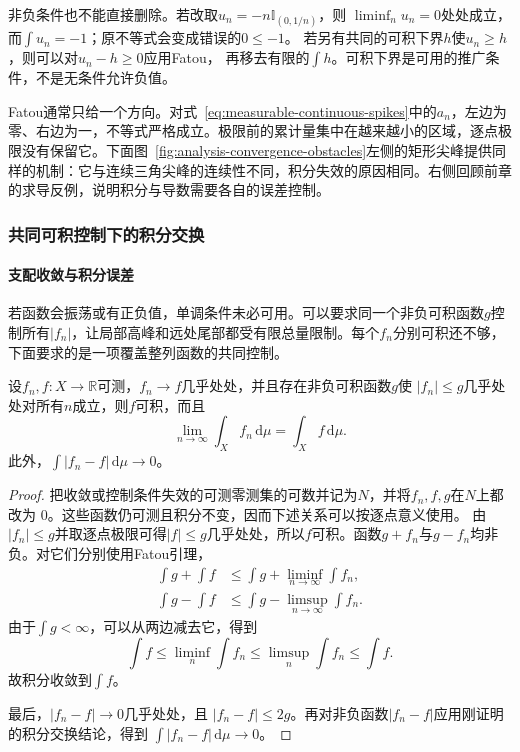 非负条件也不能直接删除。若改取$u_n=-n\mathbb I_{(0,1/n)}$，则
$\liminf_n u_n=0$处处成立，而$\int u_n=-1$；原不等式会变成错误的$0\leq-1$。
若另有共同的可积下界$h$使$u_n\geq h$，则可以对$u_n-h\geq0$应用Fatou，
再移去有限的$\int h$。可积下界是可用的推广条件，不是无条件允许负值。

Fatou通常只给一个方向。对式~\eqref{eq:measurable-continuous-spikes}中的$a_n$，左边为零、右边为一，不等式严格成立。极限前的累计量集中在越来越小的区域，逐点极限没有保留它。下面图~\ref{fig:analysis-convergence-obstacles}左侧的矩形尖峰提供同样的机制：它与连续三角尖峰的连续性不同，积分失效的原因相同。右侧回顾前章的求导反例，说明积分与导数需要各自的误差控制。

\subsubsection{共同可积控制下的积分交换}
\paragraph{支配收敛与积分误差}

若函数会振荡或有正负值，单调条件未必可用。可以要求同一个非负可积函数$g$控制所有$|f_n|$，让局部高峰和远处尾部都受有限总量限制。每个$f_n$分别可积还不够，下面要求的是一项覆盖整列函数的共同控制。

\begin{theorem}[支配收敛定理]
\label{thm:analysis-dominated-convergence}
设$f_n,f:X\to\mathbb{R}$可测，$f_n\to f$几乎处处，并且存在非负可积函数$g$使
$|f_n|\leq g$几乎处处对所有$n$成立，则$f$可积，而且
\[   \lim_{n\to\infty}\int_Xf_n\,\mathrm{d}\mu   =   \int_Xf\,\mathrm{d}\mu. \]
此外，$\int|f_n-f|\,\mathrm{d}\mu\to0$。
\end{theorem}
\begin{proof}
把收敛或控制条件失效的可测零测集的可数并记为$N$，并将$f_n,f,g$在$N$上都改为
$0$。这些函数仍可测且积分不变，因而下述关系可以按逐点意义使用。
由$|f_n|\leq g$并取逐点极限可得$|f|\leq g$几乎处处，所以$f$可积。函数$g+f_n$与$g-f_n$均非负。对它们分别使用Fatou引理，
\begin{align*}
  \int g+\int f
  &\leq
  \int g+\liminf_{n\to\infty}\int f_n,\\
  \int g-\int f
  &\leq
  \int g-\limsup_{n\to\infty}\int f_n.
\end{align*}
由于$\int g<\infty$，可以从两边减去它，得到
\[   \int f   \leq\liminf_n\int f_n   \leq\limsup_n\int f_n   \leq\int f. \]
故积分收敛到$\int f$。

最后，$|f_n-f|\to0$几乎处处，且 $|f_n-f|\leq2g$。再对非负函数$|f_n-f|$应用刚证明的积分交换结论，得到 $\int|f_n-f|\,\mathrm{d}\mu\to0$。
\end{proof}

